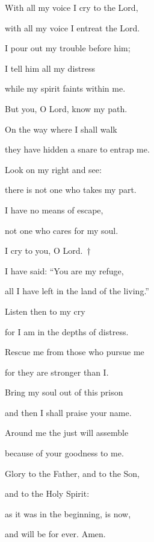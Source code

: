 \noindent With all my voice I cry to the Lord,~\GreStar{}~\nopagebreak

with all my voice I entreat the Lord.

\noindent I pour out my trouble before him;~\GreStar{}~\nopagebreak

I tell him all my distress

\noindent while my spirit faints within me.~\GreStar{}~\nopagebreak

But you, O Lord, know my path.

\noindent On the way where I shall walk~\GreStar{}~\nopagebreak

they have hidden a snare to entrap me.

\noindent Look on my right and see:~\GreStar{}~\nopagebreak

there is not one who takes my part.

\noindent I have no means of escape,~\GreStar{}~\nopagebreak

not one who cares for my soul.

\noindent I cry to you, O Lord.~†~\nopagebreak

I have said: “You are my refuge,~\GreStar{}~\nopagebreak

all I have left in the land of the living.”

\noindent Listen then to my cry~\GreStar{}~\nopagebreak

for I am in the depths of distress.

\noindent Rescue me from those who pursue me~\GreStar{}~\nopagebreak

for they are stronger than I.

\noindent Bring my soul out of this prison~\GreStar{}~\nopagebreak

and then I shall praise your name.

\noindent Around me the just will assemble~\GreStar{}~\nopagebreak

because of your goodness to me.

\noindent Glory to the Father, and to the Son,~\GreStar{}~\nopagebreak

and to the Holy Spirit:

\noindent as it was in the beginning, is now,~\GreStar{}~\nopagebreak

and will be for ever. Amen.
